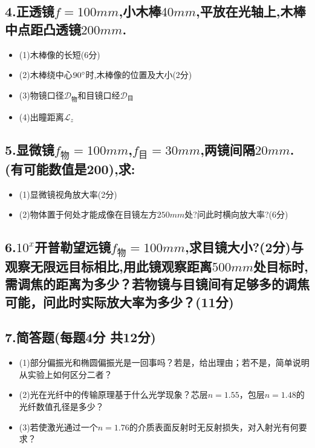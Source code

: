 \documentclass[11pt,a4paper]{article}
\begin{document}
    \subsection*{4.正透镜$f=100mm$,小木棒$40mm$,平放在光轴上,木棒中点距凸透镜$200mm$.}
    \begin{itemize}
        \vspace{0mm}
        \item (1)木棒像的长短(6分)
        \vspace{0mm}
        \item (2)木棒绕中心$90\degree $时,木棒像的位置及大小(2分)
        \vspace{0mm}
        \item (3)物镜口径\(\mathcal{D}_{\text{物}}\)和目镜口经\(\mathcal{D}_{\text{目}}\) 
        \vspace{0mm}
        \item (4)出瞳距离\(\mathcal{L}_{z}\)
    \end{itemize}
    \vspace{20mm}
    \subsection*{5.显微镜$f_\text{物}=100mm$,$f_\text{目}=30mm$,两镜间隔$20mm$.(有可能数值是200),求:}
    \begin{itemize}
        \vspace{0mm}
        \item (1)显微镜视角放大率(2分)
        \vspace{0mm}
        \item (2)物体置于何处才能成像在目镜左方$250mm处$?问此时横向放大率?(6分)
        \vspace{0mm}
    \end{itemize}
    \vspace{20mm}
    \subsection*{6.$10^{x}$开普勒望远镜$f_\text{物}=100mm$,求目镜大小?(2分)与观察无限远目标相比,用此镜观察距离$500mm$处目标时,需调焦的距离为多少？若物镜与目镜间有足够多的调焦可能，问此时实际放大率为多少？(11分)}
    \vspace{10mm}
    \subsection*{7.简答题(每题4分 共12分)}
    \begin{itemize}
        \vspace{-3mm}
        \item (1)部分偏振光和椭圆偏振光是一回事吗？若是，给出理由；若不是，简单说明从实验上如何区分二者？
        \vspace{-3mm}
        \item (2)光在光纤中的传输原理基于什么光学现象？芯层$n=1.55$，包层$n=1.48$的光纤数值孔径是多少？
        \vspace{-3mm}
        \item (3)若使激光通过一个$n=1.76$的介质表面反射时无反射损失，对入射光有何要求？
    \end{itemize}
\end{document}
